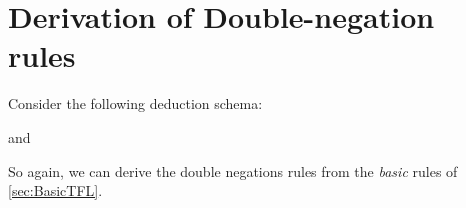 \section{Derivation of Double-negation rules}
Consider the following deduction schema:

\begin{fitchproof}
	\open
	\close
{}
\end{fitchproof}
and

\begin{fitchproof}
	\open
	\close
{}
\end{fitchproof}
So again,  we can derive the double negations rules from the \emph{basic} rules of \cref{sec:BasicTFL}.




%
%
%
%

